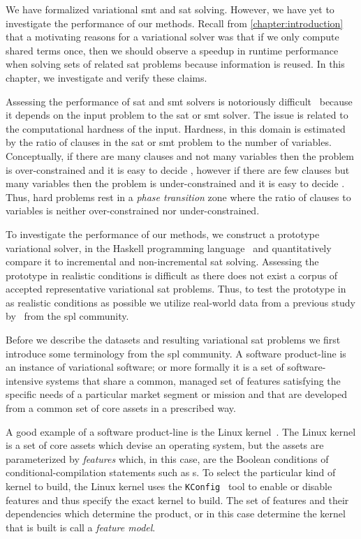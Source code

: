 \label{chapter:case-studies}
%
We have formalized variational \ac{smt} and \ac{sat} solving. However, we have
yet to investigate the performance of our methods. Recall from
\autoref{chapter:introduction} that a motivating reasons for a variational
solver was that if we only compute shared terms once, then we should observe a
speedup in runtime performance when solving sets of related \ac{sat} problems
because information is reused. In this chapter, we investigate and verify these
claims.

Assessing the performance of \ac{sat} and \ac{smt} solvers is notoriously
difficult~\cite{Gent94thesat} because it depends on the input problem to the
\ac{sat} or \ac{smt} solver. The issue is related to the computational hardness
of the input. Hardness, in this domain is estimated by the ratio of clauses in
the \ac{sat} or \ac{smt} problem to the number of variables. Conceptually, if
there are many clauses and not many variables then the problem is
over-constrained and it is easy to decide , however if there are few
clauses but many variables then the problem is under-constrained and it is easy
to decide . Thus, hard problems rest in a \emph{phase transition} zone
where the ratio of clauses to variables is neither over-constrained nor
under-constrained.

To investigate the performance of our methods, we construct a prototype
variational solver, \vsat{} in the Haskell programming
language~\cite{Hudak:1992:RPL:130697.130699} and quantitatively compare it to
incremental and non-incremental \ac{sat} solving. Assessing the prototype in
realistic conditions is difficult as there does not exist a corpus of accepted
representative variational \ac{sat} problems. Thus, to test the prototype in as
realistic conditions as possible we utilize real-world data from a previous
study by~\citet{NMS+:GPCE18} from the \ac{spl} community.

Before we describe the datasets and resulting variational \ac{sat} problems we
first introduce some terminology from the \ac{spl} community. A software
product-line is an instance of variational software; or
more formally it is a set of software-intensive systems that share a common,
managed set of features satisfying the specific needs of a particular market
segment or mission and that are developed from a common set of core assets in a
prescribed way.

A good example of a software product-line is the Linux kernel~\cite{linux}. The
Linux kernel is a set of core assets which devise an operating system, but the
assets are parameterized by \emph{features} which, in this case, are the Boolean
conditions of conditional-compilation statements such as s. To select
the particular kind of kernel to build, the Linux kernel uses the
\texttt{KConfig}~\cite{kconfig} tool to enable or disable features and thus
specify the exact kernel to build. The set of features and their dependencies
which determine the product, or in this case determine the kernel that is built
is call a \emph{feature model}\cite{KCHNP90}.

